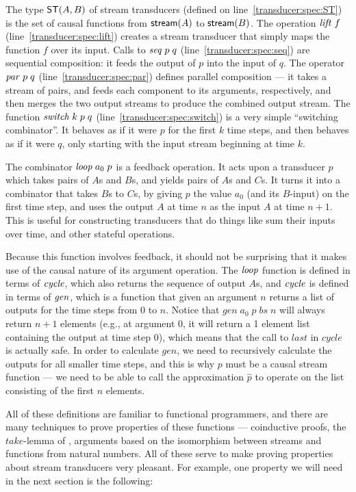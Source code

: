 \documentclass[preprint,natbib]{sigplanconf}
\begin{document}
The type $\mbox{\textsf{{ST}}}({A}, {B})$ of stream transducers (defined on
line~\ref{transducer:spec:ST}) is the set of causal functions from
$\mbox{\textsf{{stream}}}({A})$ to $\mbox{\textsf{{stream}}}({B})$. The operation $\mathit{lift}\;f$
(line~\ref{transducer:spec:lift}) creates a stream transducer that
simply maps the function $f$ over its input.  Calls to $\mathit{seq}\;p\;q$
(line~\ref{transducer:spec:seq}) are sequential composition: it feeds
the output of $p$ into the input of $q$. The operator $\mathit{par}\;p\;q$
(line~\ref{transducer:spec:par}) defines parallel composition --- it
takes a stream of pairs, and feeds each component to its arguments,
respectively, and then merges the two output streams to produce the
combined output stream. The function $\mathit{switch}\;k\;p\;q$
(line~\ref{transducer:spec:switch}) is a very simple ``switching
combinator''.  It behaves as if it were $p$ for the first $k$ time
steps, and then behaves as if it were $q$, only starting with the
input stream beginning at time $k$.

The combinator $\mathit{loop}\;a_0\;p$ is a feedback operation. It acts
upon a transducer $p$ which takes pairs of $A$s and $B$s, and yields
pairs of $A$s and $C$s. It turns it into a combinator that takes $B$s
to $C$s, by giving $p$ the value $a_0$ (and its $B$-input) on the
first time step, and uses the output $A$ at time $n$ as the input $A$
at time $n+1$. This is useful for constructing transducers that do
things like sum their inputs over time, and other stateful operations. 

Because this function involves feedback, it should not be surprising
that it makes use of the causal nature of its argument operation. The
$\mathit{loop}$ function is defined in terms of $\mathit{cycle}$, which also 
returns the sequence of output $A$s, and $\mathit{cycle}$ is defined in 
terms of $\mathit{gen}$, which is a function that given an argument $n$ returns a list of
outputs for the time steps from $0$ to $n$. Notice that
$gen\;a_0\;p\;bs\;n$ will always return $n+1$ elements (e.g., at
argument 0, it will return a 1 element list containing the output at
time step 0), which means that the call to $last$ in $cycle$ is
actually safe. In order to calculate $gen$, we need to recursively
calculate the outputs for all smaller time steps, and this is why $p$
must be a causal stream function --- we need to be able to call the 
approximation $\hat{p}$ to operate on the list consisting of
the first $n$ elements. 

All of these definitions are familiar to functional programmers, and
there are many techniques to prove properties of these functions ---
coinductive proofs, the $take$-lemma of \citet{bird-wadler}, arguments based on
the isomorphism between streams and functions from natural
numbers. All of these serve to make proving properties about stream
transducers very pleasant. For example, one property we will need in
the next section is the following:
\end{document}
